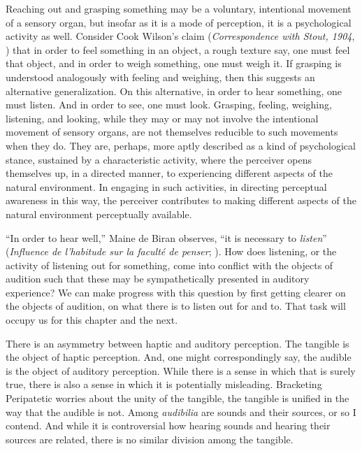 Reaching out and grasping something may be a voluntary, intentional movement of a sensory organ, but insofar as it is a mode of perception, it is a psychological activity as well. Consider Cook Wilson's claim (\emph{Correspondence with Stout, 1904}, \citeyear{Cook-Wilson:1926sf}) that in order to feel something in an object, a rough texture say, one must feel that object, and in order to weigh something, one must weigh it. If grasping is understood analogously with feeling and weighing, then this suggests an alternative generalization. On this alternative, in order to hear something, one must listen. And in order to see, one must look. Grasping, feeling, weighing, listening, and looking, while they may or may not involve the intentional movement of sensory organs, are not themselves reducible to such movements when they do. They are, perhaps, more aptly described as a kind of psychological stance, sustained by a characteristic activity, where the perceiver opens themselves up, in a directed manner, to experiencing different aspects of the natural environment. In engaging in such activities, in directing perceptual awareness in this way, the perceiver contributes to making different aspects of the natural environment perceptually available.

``In order to hear well,'' Maine de Biran observes, ``it is necessary to \emph{listen}'' (\emph{Influence de l'habitude sur la faculté de penser}; \citealt[63--4]{Boehm:1929aa}). How does listening, or the activity of listening out for something, come into conflict with the objects of audition such that these may be sympathetically presented in auditory experience? We can make progress with this question by first getting clearer on the objects of audition, on what there is to listen out for and to. That task will occupy us for this chapter and the next.

There is an asymmetry between haptic and auditory perception. The tangible is the object of haptic perception. And, one might correspondingly say, the audible is the object of auditory perception. While there is a sense in which that is surely true, there is also a sense in which it is potentially misleading. Bracketing Peripatetic worries about the unity of the tangible, the tangible is unified in the way that the audible is not. Among \emph{audibilia} are sounds and their sources, or so I contend. And while it is controversial how hearing sounds and hearing their sources are related, there is no similar division among the tangible.

